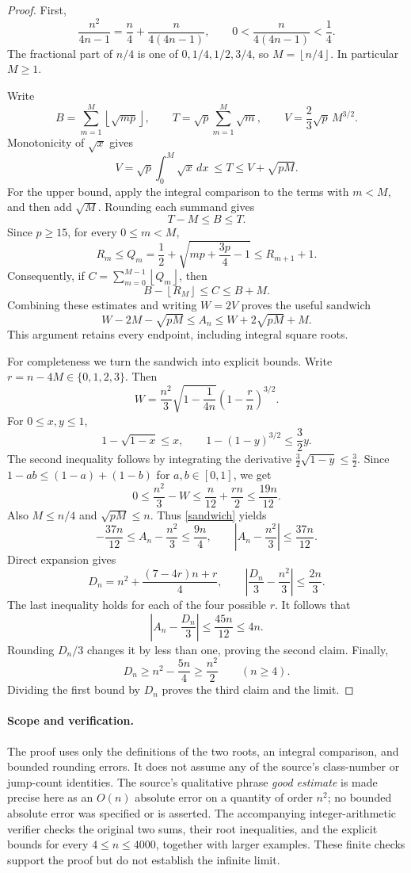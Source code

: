 \documentclass[11pt]{article}
\newcommand{\fl}[1]{\left\lfloor #1\right\rfloor}
\begin{document}
\begin{proof}
First,
\[
 \frac{n^2}{4n-1}=\frac n4+\frac{n}{4(4n-1)},\qquad
 0<\frac{n}{4(4n-1)}<\frac14.
\]
The fractional part of \(n/4\) is one of \(0,1/4,1/2,3/4\), so
\(M=\fl{n/4}\). In particular \(M\ge1\).

Write
\[
 B=\sum_{m=1}^M\fl{\sqrt{mp}},\qquad
 T=\sqrt p\sum_{m=1}^M\sqrt m,\qquad
 V=\frac23\sqrt p\,M^{3/2}.
\]
Monotonicity of \(\sqrt x\) gives
\[
 V=\sqrt p\int_0^M\sqrt x\,dx\ \le T\le V+\sqrt{pM}.
\]
For the upper bound, apply the integral comparison to the terms with
\(m<M\), and then add \(\sqrt M\). Rounding each summand gives
\[
 T-M\le B\le T.
\]
Since \(p\ge15\), for every \(0\le m<M\),
\[
 R_m\le Q_m=\frac12+\sqrt{mp+\frac{3p}{4}-1}
          \le R_{m+1}+1.
\]
Consequently, if \(C=\sum_{m=0}^{M-1}\fl{Q_m}\), then
\[
 B-\fl{R_M}\le C\le B+M.
\]
Combining these estimates and writing \(W=2V\) proves the useful sandwich
\begin{equation}\label{sandwich}
 W-2M-\sqrt{pM}\le A_n\le W+2\sqrt{pM}+M.
\end{equation}
This argument retains every endpoint, including integral square roots.

For completeness we turn the sandwich into explicit bounds. Write
\(r=n-4M\in\{0,1,2,3\}\). Then
\[
 W=\frac{n^2}{3}
       \sqrt{1-\frac1{4n}}\left(1-\frac rn\right)^{3/2}.
\]
For \(0\le x,y\le1\),
\[
 1-\sqrt{1-x}\le x,\qquad
 1-(1-y)^{3/2}\le\frac32y .
\]
The second inequality follows by integrating the derivative
\(\frac32\sqrt{1-y}\le\frac32\). Since \(1-ab\le(1-a)+(1-b)\)
for \(a,b\in[0,1]\), we get
\[
 0\le\frac{n^2}{3}-W
 \le\frac n{12}+\frac{rn}{2}\le\frac{19n}{12}.
\]
Also \(M\le n/4\) and \(\sqrt{pM}\le n\). Thus \eqref{sandwich} yields
\[
 -\frac{37n}{12}\le A_n-\frac{n^2}{3}\le\frac{9n}{4},
 \qquad
 \left|A_n-\frac{n^2}{3}\right|\le\frac{37n}{12}.
\]
Direct expansion gives
\[
 D_n=n^2+\frac{(7-4r)n+r}{4},\qquad
 \left|\frac{D_n}{3}-\frac{n^2}{3}\right|\le\frac{2n}{3}.
\]
The last inequality holds for each of the four possible \(r\).
It follows that
\[
 \left|A_n-\frac{D_n}{3}\right|
 \le\frac{45n}{12}\le4n.
\]
Rounding \(D_n/3\) changes it by less than one, proving the second claim.
Finally,
\[
 D_n\ge n^2-\frac{5n}{4}\ge\frac{n^2}{2}\qquad(n\ge4).
\]
Dividing the first bound by \(D_n\) proves the third claim and the limit.
\end{proof}

\paragraph{Scope and verification.}
The proof uses only the definitions of the two roots, an integral
comparison, and bounded rounding errors. It does not assume any of the
source's class-number or jump-count identities. The source's qualitative
phrase \emph{good estimate} is made precise here as an \(O(n)\) absolute
error on a quantity of order \(n^2\); no bounded absolute error was
specified or is asserted.
The accompanying integer-arithmetic verifier checks the original two
sums, their root inequalities, and the explicit bounds for every
\(4\le n\le4000\), together with larger examples. These finite checks
support the proof but do not establish the infinite limit.
\end{document}
